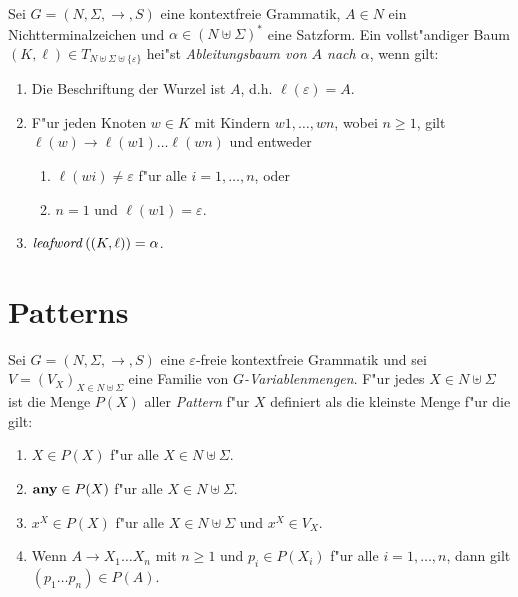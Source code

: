 \documentclass[12pt,a4paper]{article}
\begin{document}
\begin{definition}[Ableitungsbaum]
  Sei $G=(N,\Sigma,\to,S)$ eine kontextfreie Grammatik, $A \in N$ ein Nichtterminalzeichen und
  $\alpha \in (N \uplus \Sigma)^*$ eine Satzform. Ein vollst"andiger Baum
  $(K,\ell) \in T_{N \uplus \Sigma \uplus \{\varepsilon\}}$ hei"st
  \emph{Ableitungsbaum von $A$ nach $\alpha$}, wenn gilt:
  \begin{enumerate}
  \item Die Beschriftung der Wurzel ist $A$, d.h. $\ell(\varepsilon)=A$.
  \item F"ur jeden Knoten $w \in K$ mit Kindern $w1,\ldots,wn$, wobei $n \ge 1$, gilt
    $\ell(w) \to \ell(w1)\ldots\ell(wn)$ und entweder
    \begin{enumerate}
    \item $\ell(wi)\ne\varepsilon$ f"ur alle $i=1,\ldots,n$, oder
    \item $n = 1$ und $\ell(w1)=\varepsilon$.
    \end{enumerate}
  \item $\mathit{leafword}\,((K,\ell)) = \alpha$.
  \end{enumerate}
\end{definition}


\section{Patterns}

\begin{definition}[Patterns]
  Sei $G = (N,\Sigma,\to,S)$ eine $\varepsilon$-freie kontextfreie Grammatik und sei
  $V = (V_X)_{X\in N \uplus \Sigma}$ eine Familie von \emph{$G$-Variablenmengen}. F"ur
  jedes $X \in N \uplus \Sigma$ ist die Menge $P(X)$ aller \emph{Pattern} f"ur $X$
  definiert als die kleinste Menge f"ur die gilt:
  \begin{enumerate}
  \item $X \in P(X)$ f"ur alle $X \in N \uplus \Sigma$.
  \item $\mathbf{any} \in P(X)$ f"ur alle $X \in N \uplus \Sigma$.
  \item $x^X \in P(X)$ f"ur alle $X \in N \uplus \Sigma$ und $x^X \in V_X$.
  \item Wenn $A \to X_1 \ldots X_n$ mit $n \ge 1$ und $p_i \in P(X_i)$ f"ur alle $i=1,\ldots,n$,
    dann gilt $(p_1 \ldots p_n) \in P(A)$.
  \end{enumerate}
\end{definition}
\end{document}
